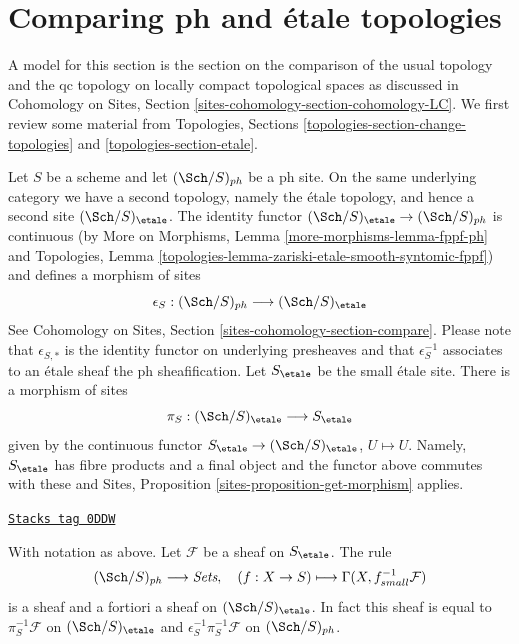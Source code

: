 \section{Comparing ph and \'etale topologies}
\label{etale-cohomology-section-ph-etale}
A model for this section is the section on the comparison of the
usual topology and the qc topology on locally compact topological
spaces as discussed in Cohomology on Sites, Section
\ref{sites-cohomology-section-cohomology-LC}.
We first review some material from
Topologies, Sections
\ref{topologies-section-change-topologies} and
\ref{topologies-section-etale}.

\medskip\noindent
Let $S$ be a scheme and let $(\Sch/S)_{ph}$ be a ph site.
On the same underlying category we have a second topology,
namely the \'etale topology, and hence a second site
$(\Sch/S)_\etale$. The identity functor
$(\Sch/S)_\etale \to (\Sch/S)_{ph}$ is continuous
(by More on Morphisms, Lemma \ref{more-morphisms-lemma-fppf-ph}
and Topologies, Lemma
\ref{topologies-lemma-zariski-etale-smooth-syntomic-fppf})
and defines a morphism of sites
$$
\epsilon_S : (\Sch/S)_{ph} \longrightarrow (\Sch/S)_\etale
$$
See Cohomology on Sites, Section \ref{sites-cohomology-section-compare}.
Please note that $\epsilon_{S, *}$ is the identity functor on underlying
presheaves and that $\epsilon_S^{-1}$ associates to an \'etale sheaf the
ph sheafification.
Let $S_\etale$ be the small \'etale site.
There is a morphism of sites
$$
\pi_S : (\Sch/S)_\etale \longrightarrow S_\etale
$$
given by the continuous functor
$S_\etale \to (\Sch/S)_\etale$, $U \mapsto U$.
Namely, $S_\etale$ has fibre products and a final object and the
functor above commutes with these and
Sites, Proposition \ref{sites-proposition-get-morphism} applies.

\begin{lemma}
\label{etale-cohomology-lemma-describe-pullback-pi-ph}
\href{https://stacks.math.columbia.edu/tag/0DDW}{\texttt{Stacks tag 0DDW}}

With notation as above.
Let $\mathcal{F}$ be a sheaf on $S_\etale$. The rule
$$
(\Sch/S)_{ph} \longrightarrow \textit{Sets},\quad
(f : X \to S) \longmapsto \Gamma(X, f_{small}^{-1}\mathcal{F})
$$
is a sheaf and a fortiori a sheaf on $(\Sch/S)_\etale$.
In fact this sheaf is equal to
$\pi_S^{-1}\mathcal{F}$ on $(\Sch/S)_\etale$ and
$\epsilon_S^{-1}\pi_S^{-1}\mathcal{F}$ on $(\Sch/S)_{ph}$.
\end{lemma}

